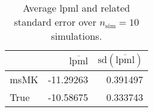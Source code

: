 \begin{table}[H]

\caption{Average lpml and related standard error over $n_{\text{sim}} = 10$ simulations.}
\centering
\begin{tabular}[t]{lrr}
\toprule
  & $\overbar{\text{lpml}}$ & $\text{sd}(\overbar{\text{lpml}})$\\
\midrule
msMK & -11.29263 & 0.391497\\
True & -10.58675 & 0.333743\\
\bottomrule
\end{tabular}
\end{table}
